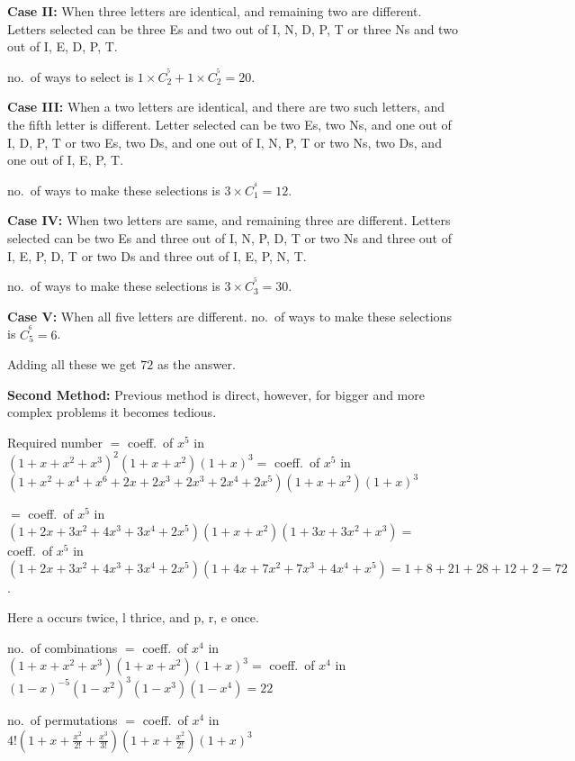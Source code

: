   {\bf Case II:} When three letters are identical, and remaining two are different. Letters selected can be
  three E\symbol[rightquote]s and two out of I, N, D, P, T or three N\symbol[rightquote]s and two out of I,
  E, D, P, T.

  no.\ of ways to select is $1\times C_2^^5 + 1\times C_2^^5 = 20$.

  {\bf Case III:} When a two letters are identical, and there are two such letters, and the fifth letter is
  different. Letter selected can be two E\symbol[rightquote]s, two N\symbol[rightquote]s, and one out of I,
  D, P, T or two E\symbol[rightquote]s, two D\symbol[rightquote]s, and one out of I, N, P, T or two
  N\symbol[rightquote]s, two D\symbol[rightquote]s, and one out of I, E, P, T.

  no.\ of ways to make these selections is $3\times C_1^^4 = 12$.

  {\bf Case IV:} When two letters are same, and remaining three are different. Letters selected can be two
  E\symbol[rightquote]s and three out of I, N, P, D, T or two N\symbol[rightquote]s and three out of I, E,
  P, D, T or two D\symbol[rightquote]s and three out of I, E, P, N, T.

  no.\ of ways to make these selections is $3\times C_3^^5 = 30$.

  {\bf Case V:} When all five letters are different. no.\ of ways to make these selections is $C_5^^6 = 6$.

  Adding all these we get $72$ as the answer.

  {\bf Second Method:} Previous method is direct, however, for bigger and more complex problems it becomes
  tedious.

  Required number $=$ coeff.\ of $x^5$ in $(1 + x + x^2 + x^3)^2(1 + x + x^2)(1 + x)^3 =$ coeff.\ of $x^5$ in
  $(1 + x^2 + x^4 + x^6 + 2x + 2x^3 + 2x^3 + 2x^4 + 2x^5)(1 + x + x^2)(1 + x)^3$

  $=$ coeff.\ of $x^5$ in $(1 + 2x + 3x^2 + 4x^3 + 3x^4 + 2x^5)(1 + x + x^2)(1 + 3x + 3x^2 + x^3) =$
  coeff.\ of $x^5$ in $(1 + 2x + 3x^2 + 4x^3 + 3x^4 + 2x^5)(1 + 4x + 7x^2 + 7x^3 + 4x^4 + x^5) = 1 + 8 + 21 +
  28 + 12 + 2 = 72$.
\item Here a occurs twice, l thrice, and p, r, e once.

  no.\ of combinations $=$ coeff.\ of $x^4$ in $(1 + x + x^2 + x^3)(1 + x + x^2)(1 + x)^3 =$ coeff.\ of $x^4$
  in $(1 - x)^{-5}(1 - x^2)^3(1 - x^3)(1 - x^4) = 22$

  no.\ of permutations $=$ coeff.\ of $x^4$ in $4!\left(1 + x + \frac{x^2}{2!} + \frac{x^3}{3!}\right)\left(1 + x +
  \frac{x^2}{2!}\right)(1 + x)^3$

